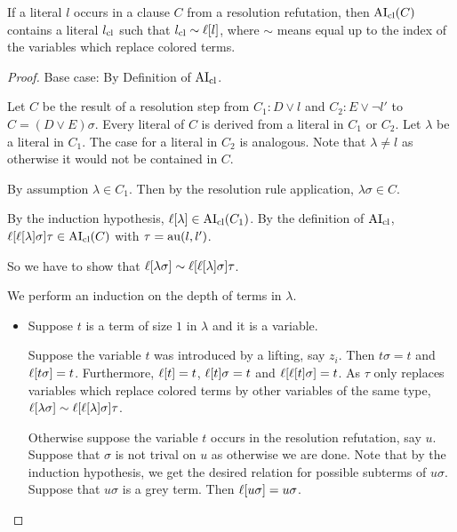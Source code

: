 \documentclass[,%
	paper=a4,%
	twoside=false,%
	liststotoc,
	bibtotoc,
	draft=false,%
	numbers=noendperiod
]{scrartcl}
\begin{document}
\begin{lemma} 
	\label{lemma:literal_in_clause}
	If a literal $l$ occurs in a clause $C$ from a resolution refutation,
	then $\operatorname{AI}_\mathrm{cl}(C)$ contains a literal $l_\mathrm{cl}$ such that $l_\mathrm{cl} \sim \ell[l]$, where $\sim$ means equal up to the index of the variables which replace colored terms.
\end{lemma}
\begin{proof}
	Base case: By Definition of $\operatorname{AI}_\mathrm{cl}$.

	Let $C$ be the result of a resolution step from $C_1: D\lor l$ and $C_2: E\lor \lnot l'$ to $C = (D \lor E)\sigma$.
	Every literal of $C$ is derived from a literal in $C_1$ or $C_2$. Let $\lambda$ be a literal in $C_1$. The case for a literal in $C_2$ is analogous.
	Note that $\lambda \neq l$ as otherwise it would not be contained in $C$.

	By assumption $\lambda \in C_1$. Then by the resolution rule application, $\lambda\sigma \in C$.

	By the induction hypothesis, $\ell[\lambda] \in \operatorname{AI}_\mathrm{cl}(C_1)$.
	By the definition of $\operatorname{AI}_\mathrm{cl}$, $\ell[\ell[\lambda]\sigma]\tau \in \operatorname{AI}_\mathrm{cl}(C)$ 
	with $\tau = \operatorname{au}(l, l')$.

	So we have to show that $\ell[ \lambda \sigma ]  \sim \ell[\ell[\lambda]\sigma]\tau$.

	We perform an induction on the depth of terms in $\lambda$.
	\begin{itemize}
			\item Suppose $t$ is a term of size $1$ in $\lambda$ and  it is a variable.

				Suppose the variable $t$ was introduced by a lifting, say $z_i$.
				Then $t\sigma = t$ and $\ell[t\sigma] = t$.
				Furthermore, $\ell[t] = t$, $\ell[t]\sigma = t$ and $\ell[\ell[t]\sigma] = t$.
				As $\tau$ only replaces variables which replace colored terms by other variables of the same type, $\ell[\lambda \sigma] \sim \ell[\ell[\lambda]\sigma]\tau$.

				Otherwise suppose the variable $t$ occurs in the resolution refutation, say $u$.
				Suppose that $\sigma$ is not trival on $u$ as otherwise we are done.
				Note that by the induction hypothesis, we get the desired relation for possible subterms of $u\sigma$.
				Suppose that $u\sigma$ is a grey term. Then $\ell[u\sigma] = u\sigma$. 


\end{itemize}
\end{proof}
\end{document}
